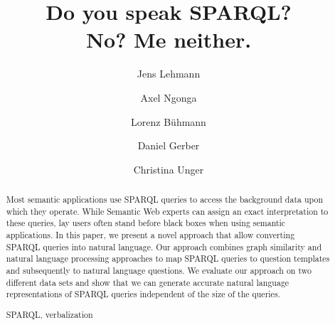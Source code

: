 \documentclass[runningheads,a4paper]{llncs}
\newcommand{\keywords}[1]{\par\addvspace\baselineskip
\noindent\keywordname\enspace\ignorespaces#1}
\begin{document}
\mainmatter  %

\title{Do you speak SPARQL?\\ No? Me neither.}


%
%
\author{Jens Lehmann%
\and Axel Ngonga\and Lorenz B\"uhmann \and Daniel Gerber \and Christina Unger}
%


%
%


\maketitle


\begin{abstract}
Most semantic applications use SPARQL queries to access the background data upon which they operate. While Semantic Web experts can assign an exact interpretation to these queries, lay users often stand before black boxes when using semantic applications. In this paper, we present a novel approach that allow converting SPARQL queries into natural language. Our approach combines graph similarity and natural language processing approaches to map SPARQL queries to question templates and subsequently to natural language questions. We evaluate our approach on two different data sets and show that we can generate accurate natural language representations of SPARQL queries independent of the size of the queries.
\keywords{SPARQL, verbalization}
\end{abstract}
\end{document}
